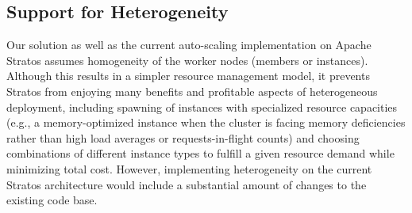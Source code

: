 \subsection{Support for Heterogeneity}
Our solution as well as the current auto-scaling implementation on Apache Stratos assumes homogeneity of the worker nodes (members or instances). Although this results in a simpler resource management model, it prevents Stratos from enjoying many benefits and profitable aspects of heterogeneous deployment, including spawning of instances with specialized resource capacities (e.g., a memory-optimized instance when the cluster is facing memory deficiencies rather than high load averages or requests-in-flight counts) and choosing combinations of different instance types to fulfill a given resource demand while minimizing total cost. However, implementing heterogeneity on the current Stratos architecture would include a substantial amount of changes to the existing code base.
